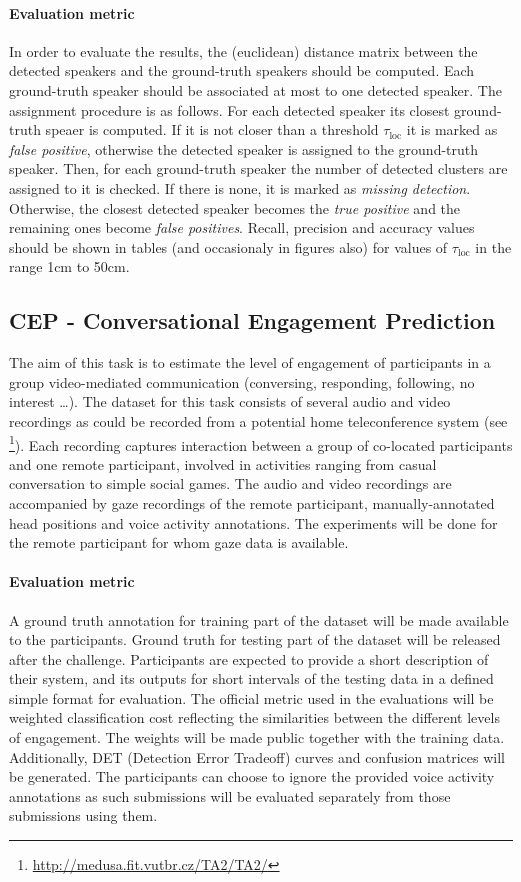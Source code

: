 \documentclass[a4paper]{article}
\begin{document}
\paragraph{Evaluation metric} In order to evaluate the results, the (euclidean) distance matrix between the detected
speakers and the ground-truth speakers should be computed. Each ground-truth speaker should be associated at most to one
detected speaker. The assignment procedure is as follows. For each detected speaker its closest ground-truth speaer is
computed. If it is not closer than a threshold $\tau_{\textrm{loc}}$ it is marked as \textit{false positive}, otherwise
the detected speaker is assigned to the ground-truth speaker. Then, for each ground-truth speaker the number of detected
clusters are assigned to it is checked. If there is none, it is marked as \textit{missing detection}. Otherwise, the
closest detected speaker becomes the \textit{true positive} and the remaining ones become \textit{false positives}.
Recall, precision and accuracy values should be shown in tables (and occasionaly in figures also) for values of
$\tau_{\textrm{loc}}$ in the range 1cm to 50cm.

\subsection*{CEP - Conversational Engagement Prediction}
The aim of this task is to estimate the level of engagement of participants in a group video-mediated communication
(conversing, responding, following, no interest …). The dataset for this task consists of several audio and video
recordings as could be recorded from a potential home teleconference system (see
\cite{Hadris12}\footnote{\url{http://medusa.fit.vutbr.cz/TA2/TA2/}}). Each recording captures interaction between a
group of co-located participants and one remote participant, involved in activities ranging from casual conversation to
simple social games. The audio and video recordings are accompanied by gaze recordings of the remote participant,
manually-annotated head positions and voice activity annotations. The experiments will be done for the remote
participant for whom gaze data is available.

\paragraph{Evaluation metric} A ground truth annotation for training part of the dataset will be made available to the
participants. Ground truth for testing part of the dataset will be released after the challenge. Participants are
expected to provide a short description of their system, and its outputs for short intervals of the testing data in a
defined simple format for evaluation. The official metric used in the evaluations will be weighted classification cost
reflecting the similarities between the different levels of engagement. The weights will be made public together with
the training data. Additionally, DET (Detection Error Tradeoff) curves and confusion matrices will be generated. The
participants can choose to ignore the provided voice activity annotations as such submissions will be evaluated
separately from those submissions using them.
\end{document}
